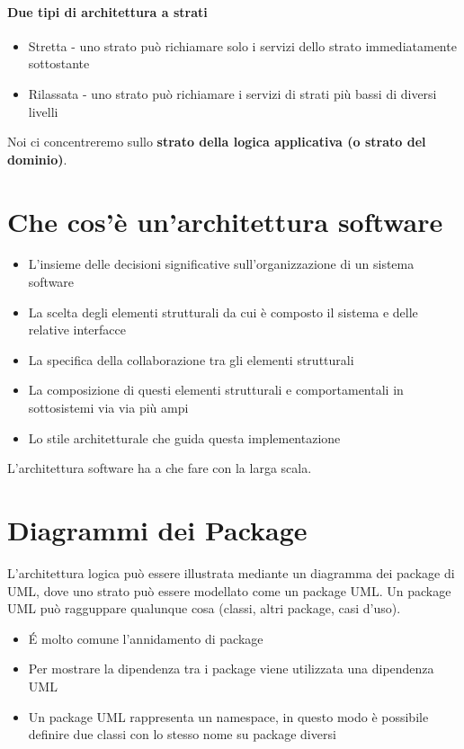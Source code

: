 \paragraph*{Due tipi di architettura a strati}
\begin{itemize}
    \item Stretta - uno strato può richiamare solo i servizi dello strato
    immediatamente sottostante
    \item Rilassata - uno strato può richiamare i servizi di strati più bassi di diversi
    livelli
\end{itemize}
Noi ci concentreremo sullo \textbf{strato della logica applicativa (o strato del dominio)}.
\section{Che cos'è un'architettura software}
\begin{itemize}
    \item L'insieme delle decisioni significative sull'organizzazione di un sistema
    software
    \item La scelta degli elementi strutturali da cui è composto il sistema e delle
    relative interfacce
    \item La specifica della collaborazione tra gli elementi strutturali
    \item La composizione di questi elementi strutturali e comportamentali in sottosistemi via
    via più ampi
    \item Lo stile architetturale che guida questa implementazione
\end{itemize}
L'architettura software ha a che fare con la larga scala.
\section{Diagrammi dei Package}
L'architettura logica può essere illustrata mediante un diagramma dei package
di UML, dove uno strato può essere modellato come un package UML.
Un package UML può ragguppare qualunque cosa (classi, altri package, casi d'uso).
\begin{itemize}
    \item \'E molto comune l'annidamento di package
    \item Per mostrare la dipendenza tra i package viene utilizzata una dipendenza UML
    \item Un package UML rappresenta un namespace, in questo modo è possibile
    definire due classi con lo stesso nome su package diversi
\end{itemize}
